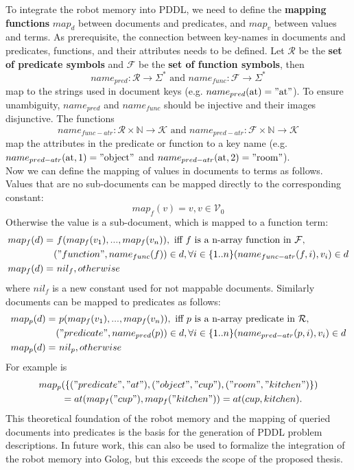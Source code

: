 To integrate the robot memory into PDDL, we need to define the
\textbf{mapping functions} $map_d$ between documents and predicates, and
$map_v$ between values and terms. As prerequisite, the connection
between key-names in documents and predicates, functions, and their
attributes needs to be defined. Let $\mathcal{R}$ be the \textbf{set
  of predicate symbols} and $\mathcal{F}$ be the \textbf{set of function
  symbols}, then
%
$$name_{pred}: \mathcal{R} \rightarrow \Sigma^*
\text{ and } name_{func}: \mathcal{F} \rightarrow \Sigma^*$$
%
map to the strings used in document keys
(e.g. $name_{pred}(\text{at})="\text{at}"$). To ensure unambiguity,
$name_{pred}$ and $name_{func}$ should
be injective and their images disjunctive. The functions
%
$$ name_{func-atr}: \mathcal{R} \times \mathbb{N} \rightarrow
\mathcal{K} \text{ and } name_{pred-atr}: \mathcal{F} \times \mathbb{N}
\rightarrow \mathcal{K}$$
%
map the attributes in the predicate or function to a key
name (e.g. $name_{pred-atr}(\text{at},1)="\text{object}"$ and
$name_{pred-atr}(\text{at},2)="\text{room}"$).
\\
Now we can define the mapping of values in documents to terms as
follows. Values that are no sub-documents can be mapped directly to
the corresponding constant:
$$map_f(v)=v, v \in \mathcal{V}_0$$
Otherwise the value is a sub-document, which is mapped to a function term:
\begin{align*}
  map_f(d)= &\text{ }f(map_f(v_1), ..., map_f(v_n)), \text{ iff } f \text{ is a n-array function in } \mathcal{F},\\
  &("function", name_{func}(f))\in d,
  \forall i \in \{1..n\} (name_{func-atr}(f,i), v_i)\in d\\
  map_f(d)= &\text{ } nil_f, otherwise\text{~~~~~~~~~~~~~~~}
\end{align*}
where $nil_f$ is a new constant used for not mappable documents.
Similarly documents can be mapped to predicates as follows:
\begin{align*}
  map_p(d)=&\text{ }p(map_f(v_1), ..., map_f(v_n)), \text{ iff } p \text{ is a n-array predicate in } \mathcal{R},\\
  &("predicate", name_{pred}(p))\in d,
  \forall i \in \{1..n\} (name_{pred-atr}(p,i), v_i)\in d\\
  map_p(d)=& \text{ }nil_p, otherwise\text{~~~~~~~~~~~~~~~}
\end{align*}
For example is
\begin{align*}
map_p&(\{("predicate", "at"),("object", "cup"),("room",
"kitchen")\})\\
&= at(map_f("cup"), map_f("kitchen")) = at(cup, kitchen) \text{.}
\end{align*}
This theoretical foundation of the robot memory and the mapping of
queried documents into predicates is the basis for the generation of
PDDL problem descriptions. In future work, this can also be used to
formalize the integration of the robot memory into Golog, but this
exceeds the scope of the proposed thesis.

